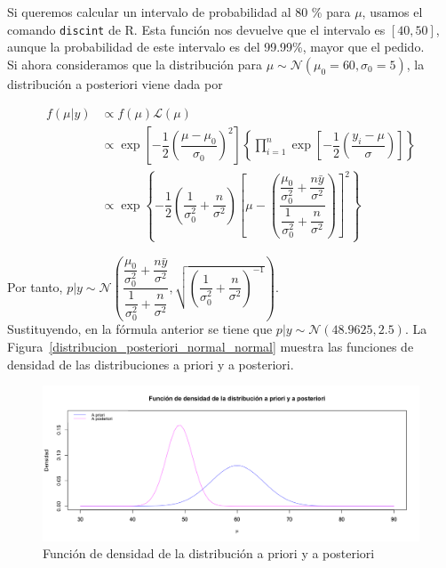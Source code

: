 \documentclass[12pt,a4paper,twoside,openright,titlepage,final]{article}
\begin{document}
Si queremos calcular un intervalo de probabilidad al 80 \% para $\mu$, usamos el comando \texttt{discint} de R. Esta función nos devuelve que el intervalo es $[40, 50]$, aunque la probabilidad de este intervalo es del 99.99\%, mayor que el pedido.\\

Si ahora consideramos que la distribución para $\mu \sim \mathcal{N}(\mu_0 = 60, \sigma_0 = 5)$, la distribución a posteriori viene dada por

\begin{align*}
f(\mu | y) & \propto f(\mu) \mathcal{L}(\mu) \\ & \propto \exp \left[ -\dfrac{1}{2} \left( \dfrac{\mu - \mu_0}{\sigma_0} \right)^2  \right] \left\{ \prod_{i=1}^{n} \exp \left[ -\dfrac{1}{2} \left( \dfrac{y_i - \mu}{\sigma} \right) \right] \right\} \\ 
& \propto \exp \left\{ -\dfrac{1}{2} \left( \dfrac{1}{\sigma_0^2} + \dfrac{n}{\sigma^2} \right) \left[ \mu - \left( \dfrac{\dfrac{\mu_0}{\sigma_0^2} + \dfrac{n \bar{y}}{\sigma^2}}{\dfrac{1}{\sigma_0^2} + \dfrac{n}{\sigma^2}} \right)\right]^2 \right\}
\end{align*}

Por tanto, $p|y \sim \mathcal{N}\left(\dfrac{\dfrac{\mu_0}{\sigma_0^2} + \dfrac{n \bar{y}}{\sigma^2}}{\dfrac{1}{\sigma_0^2} + \dfrac{n}{\sigma^2}}, \sqrt{\left( \dfrac{1}{\sigma_0^2} + \dfrac{n}{\sigma^2} \right)^{-1}}\right)$.\\

Sustituyendo, en la fórmula anterior se tiene que $p|y \sim \mathcal{N}(48.9625, 2.5)$. La Figura~\ref{distribucion_posteriori_normal_normal} muestra las funciones de densidad de las distribuciones a priori y a posteriori.\\

\begin{figure}[tbph!]
\centering
\includegraphics[width=0.9\linewidth]{./imagenes/distribucion_posteriori_normal_normal}
\caption{Función de densidad de la distribución a priori y a posteriori}
\label{fig:distribucion_posteriori_normal_normal}
\end{figure}
\end{document}
